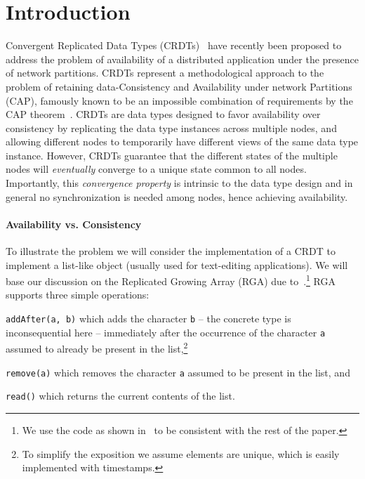 \section{Introduction}
\label{sec:introduction}

Convergent Replicated Data Types (CRDTs)~\cite{ShapiroPBZ11} have
recently been proposed to address the problem of availability of a
distributed application under the presence of network partitions.
%
CRDTs represent a methodological approach to the problem of retaining
data-Consistency and Availability under network Partitions (CAP),
famously known to be an impossible combination of requirements by the
CAP theorem~\cite{GilbertL02}.
%
CRDTs are data types designed to favor availability over consistency
by replicating the data type instances across multiple nodes, and
allowing different nodes to temporarily have different views of the
same data type instance.
%
However, CRDTs guarantee that the different states of the multiple
nodes will \emph{eventually} converge to a unique state common to all
nodes.
%
Importantly, this \emph{convergence property} is intrinsic to the data
type design and in general no synchronization is needed among nodes,
hence achieving availability.

\paragraph{Availability vs. Consistency}
To illustrate the problem we will consider the implementation of a
CRDT to implement a list-like object (usually used for text-editing
applications).
%
We will base our discussion on the Replicated Growing Array (RGA) due
to~\cite{RohJKL11}.\footnote{We use the code as shown
  in~\cite{ShapiroPBZ11} to be consistent with the rest of the paper.}
%
RGA supports three simple operations:
\begin{inparaenum}
\item \lstinline|addAfter(a, b)| which adds the character
  \lstinline|b| -- the concrete type is inconsequential here --
  immediately after the occurrence of the character \lstinline|a|
  assumed to already be present in the list,\footnote{To simplify the
    exposition we assume elements are unique, which is easily implemented
    with timestamps.}
\item \lstinline|remove(a)| which removes the character \lstinline|a|
  assumed to be present in the list, and
\item \lstinline|read()| which returns the current contents of the
  list.
\end{inparaenum}

